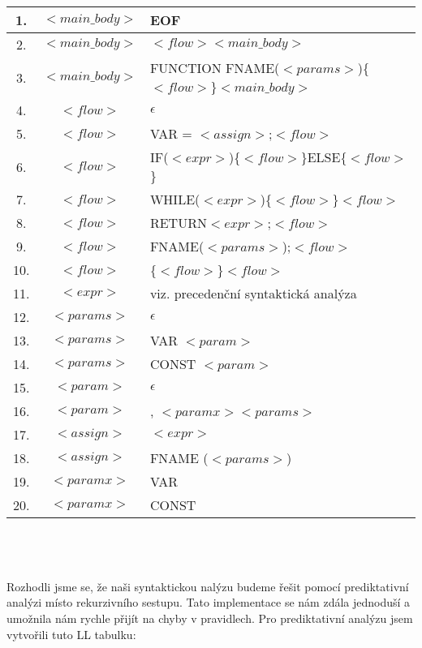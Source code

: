 \documentclass[12pt,a4paper,titlepage,final]{article}
\begin{document}
\footnotesize
\begin{tabular}{|c|c|l|}
 \hline
 1. & $<main\_body>$ & EOF \\
 \hline
 2. & $<main\_body>$ & $<flow>$$<main\_body>$ \\
 \hline
 3. & $<main\_body>$ &  FUNCTION FNAME($<params>$)\{$<flow>$\}$<main\_body>$ \\
 \hline
 4. & $<flow>$ &  $\epsilon$ \\
 \hline
 5. & $<flow>$ &  VAR = $<assign>$;$<flow>$ \\
 \hline
 6. & $<flow>$ &  IF($<expr>$)\{$<flow>$\}ELSE\{$<flow>$\} \\
 \hline
 7. & $<flow>$ &  WHILE($<expr>$)\{$<flow>$\}$<flow>$ \\
 \hline
 8. & $<flow>$ &  RETURN$<expr>$;$<flow>$ \\
 \hline
 9. & $<flow>$ &  FNAME($<params>$);$<flow>$ \\
 \hline
 10. & $<flow>$ & \{$<flow>$\}$<flow>$ \\
 \hline
 11. & $<expr>$ & viz. precedenční syntaktická analýza \\
 \hline
 12. & $<params>$ &  $\epsilon$ \\
 \hline
 13. & $<params>$ &  VAR $<param>$ \\
 \hline
 14. & $<params>$ &  CONST $<param>$ \\
 \hline
 15. & $<param>$ &  $\epsilon$ \\
 \hline
 16. & $<param>$ &  , $<paramx>$$<params>$ \\
 \hline
 17. & $<assign>$ &  $<expr>$ \\
 \hline
 18. & $<assign>$ &  FNAME ($<params>$) \\
 \hline
 19. & $<paramx>$ & VAR \\
 \hline
 20. & $<paramx>$ &  CONST \\
 \hline
\end{tabular}
\\\\\\
\normalsize
Rozhodli jsme se, že naši syntaktickou nalýzu budeme řešit pomocí prediktativní analýzi místo rekurzivního sestupu. 
Tato implementace se nám zdála jednoduší a umožnila nám rychle přijít na chyby v pravidlech. Pro prediktativní analýzu 
jsem vytvořili tuto LL tabulku: \\
\end{document}
